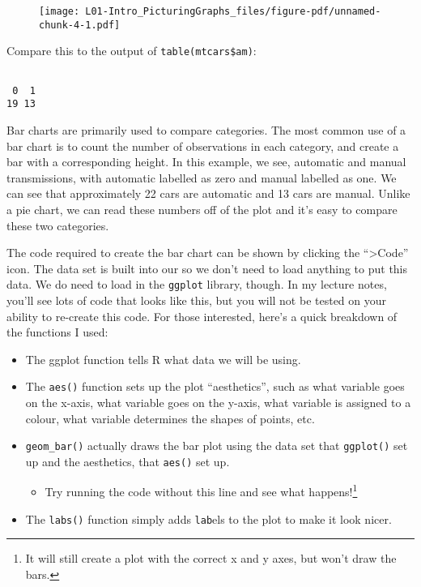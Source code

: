 \documentclass[
  letterpaper,
  DIV=11,
  numbers=noendperiod]{scrreprt}
\newenvironment{Shaded}{\begin{snugshade}}{\end{snugshade}}
\newcommand{\FunctionTok}[1]{\textcolor[rgb]{0.28,0.35,0.67}{#1}}
\newcommand{\NormalTok}[1]{\textcolor[rgb]{0.00,0.23,0.31}{#1}}
\newcommand{\SpecialCharTok}[1]{\textcolor[rgb]{0.37,0.37,0.37}{#1}}
\providecommand{\tightlist}{%
  \setlength{\itemsep}{0pt}\setlength{\parskip}{0pt}}\usepackage{longtable,booktabs,array}
\begin{document}
\begin{figure}[H]

{\centering \texttt{[image: L01-Intro\_PicturingGraphs\_files/figure-pdf/unnamed-chunk-4-1.pdf]}

}

\end{figure}

Compare this to the output of \texttt{table(mtcars\$am)}:

\begin{Shaded}
\end{Shaded}

\begin{verbatim}

 0  1 
19 13 
\end{verbatim}

Bar charts are primarily used to compare categories. The most common use
of a bar chart is to count the number of observations in each category,
and create a bar with a corresponding height. In this example, we see,
automatic and manual transmissions, with automatic labelled as zero and
manual labelled as one. We can see that approximately 22 cars are
automatic and 13 cars are manual. Unlike a pie chart, we can read these
numbers off of the plot and it's easy to compare these two categories.

The code required to create the bar chart can be shown by clicking the
``\textgreater Code'' icon. The data set is built into our so we don't
need to load anything to put this data. We do need to load in the
\texttt{ggplot} library, though. In my lecture notes, you'll see lots of
code that looks like this, but you will not be tested on your ability to
re-create this code. For those interested, here's a quick breakdown of
the functions I used:

\begin{itemize}
\tightlist
\item
  The ggplot function tells R what data we will be using.
\item
  The \texttt{aes()} function sets up the plot ``aesthetics'', such as
  what variable goes on the x-axis, what variable goes on the y-axis,
  what variable is assigned to a colour, what variable determines the
  shapes of points, etc.
\item
  \texttt{geom\_bar()} actually draws the bar plot using the data set
  that \texttt{ggplot()} set up and the aesthetics, that \texttt{aes()}
  set up.

  \begin{itemize}
  \tightlist
  \item
    Try running the code without this line and see what
    happens!\footnote{It will still create a plot with the correct x and
      y axes, but won't draw the bars.}
  \end{itemize}
\item
  The \texttt{labs()} function simply adds \texttt{lab}els to the plot
  to make it look nicer.
\end{itemize}
\end{document}
